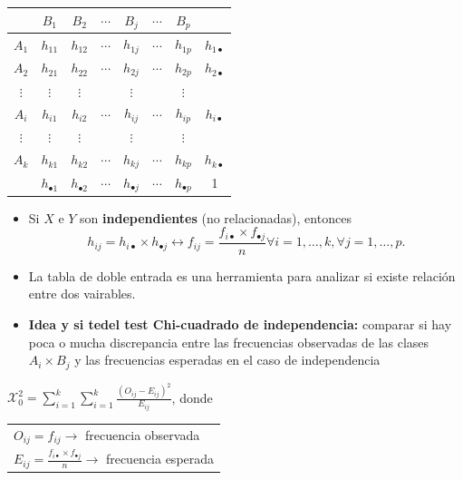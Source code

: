\begin{center}
	\noindent
	\begin{tabular}{|c||c|c|c|c|c|c|c|}
		\hline
		\backslashbox{X}{Y} & $B_1$           & $B_2$           & $\cdots$ & $B_j$           & $\cdots$ & $B_{p}$         &                \\
		\hline
		\hline
		$A_1$               & $h_{11}$        & $h_{12}$        & $\cdots$ & $h_{1j}$        & $\cdots$ & $h_{1p}$        & $h_{1\bullet}$ \\ \hline
		$A_2$               & $h_{21}$        & $h_{22}$        & $\cdots$ & $h_{2j}$        & $\cdots$ & $h_{2p}$        & $h_{2\bullet}$ \\ \hline
		$\vdots$            & $\vdots$        & $\vdots$        &          & $\vdots$        &          & $\vdots$        &                \\ \hline
		$A_i$               & $h_{i1}$        & $h_{i2}$        & $\cdots$ & $h_{ij}$        & $\cdots$ & $h_{ip}$        & $h_{i\bullet}$ \\ \hline
		$\vdots$            & $\vdots$        & $\vdots$        &          & $\vdots$        &          & $\vdots$        &                \\ \hline
		$A_k$               & $h_{k1}$        & $h_{k2}$        & $\cdots$ & $h_{kj}$        & $\cdots$ & $h_{kp}$        & $h_{k\bullet}$ \\ \hline
		& $h_{\bullet 1}$ & $h_{\bullet 2}$ & $\cdots$ & $h_{\bullet j}$ & $\cdots$ & $h_{\bullet p}$ & 1              \\ \hline
	\end{tabular}
\end{center}
\begin{itemize}
	\item Si $X$ e $Y$ son \textbf{independientes} (no relacionadas), entonces $$h_{ij}=h_{i\bullet}\times h_{\bullet j}\longleftrightarrow f_{ij} = \frac{f_{i\bullet}\times f_{\bullet j}}{n} \forall i=1, \hdots, k, \forall j=1, \hdots, p.$$
	\item La tabla de doble entrada es una herramienta para analizar si existe relación entre dos vairables.
	\item \textbf{Idea y si tedel test Chi-cuadrado de independencia:} comparar si hay poca o mucha discrepancia entre las frecuencias observadas de las clases $A_{i}\times B_{j}$ y las frecuencias esperadas en el caso de independencia
\end{itemize}

$\mathcal{X}_{0}^{2}=\displaystyle{\sum_{i=1}^{k} \sum_{i=1}^{k} \frac{(O_{ij}-E_{ij})^{2}}{E_{ij}}}$, donde \begin{tabular}{l}$O_{ij}=f_{ij}\rightarrow$ frecuencia observada\\ $E_{ij}=\displaystyle \frac{f_{i\bullet}\times f_{\bullet j}}{n} \rightarrow$ frecuencia esperada\end{tabular}

